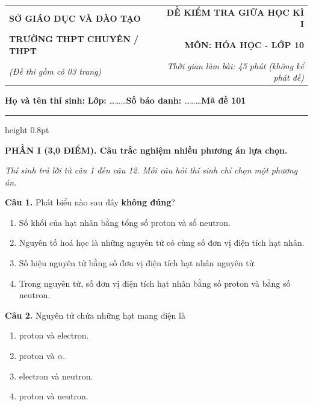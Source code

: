 \documentclass[11pt,a4paper]{article}
\begin{document}
\begin{tabularx}{\textwidth}{@{}l X r@{}}
\textbf{\small SỞ GIÁO DỤC VÀ ĐÀO TẠO} & & \textbf{\small ĐỀ KIỂM TRA GIỮA HỌC KÌ I} \\
\textbf{\normalsize TRƯỜNG THPT CHUYÊN / THPT} & & \textbf{\normalsize MÔN: HÓA HỌC - LỚP 10} \\
\textit{\small (Đề thi gồm có 03 trang)} & & \textit{\small Thời gian làm bài: 45 phút (không kể phát đề)}
\end{tabularx}

\begin{center}

\textbf{Họ và tên thí sinh:} \dotfill \quad \textbf{Lớp:} \dots\dots\dots \quad \textbf{Số báo danh:} \dots\dots\dots \hfill \textbf{\large Mã đề 101}
\end{center}
\vspace{-4pt}
{\color{gray!50}\hrule height 0.8pt}
\vspace{6pt}

{\color{myGreen}\bfseries\large PHẦN I (3,0 ĐIỂM). Câu trắc nghiệm nhiều phương án lựa chọn.}

\textit{\small Thí sinh trả lời từ câu 1 đến câu 12. Mỗi câu hỏi thí sinh chỉ chọn một phương án.}
\vspace{3pt}

\textbf{Câu 1.} Phát biểu nào sau đây \textbf{không đúng}?
\begin{enumerate}[label=\textbf{\Alph*.},leftmargin=*,itemsep=1pt,topsep=1pt]
\item Số khối của hạt nhân bằng tổng số proton và số neutron.
\item Nguyên tố hoá học là những nguyên tử có cùng số đơn vị điện tích hạt nhân.
\item Số hiệu nguyên tử bằng số đơn vị điện tích hạt nhân nguyên tử.
\item Trong nguyên tử, số đơn vị điện tích hạt nhân bằng số proton và bằng số neutron.
\end{enumerate}


\textbf{Câu 2.} Nguyên tử chứa những hạt mang điện là
\begin{enumerate}[label=\textbf{\Alph*.},leftmargin=*,itemsep=1pt,topsep=1pt]
\item proton và electron.
\item proton và $\alpha$.
\item electron và neutron.
\item proton và neutron.
\end{enumerate}
\end{document}
